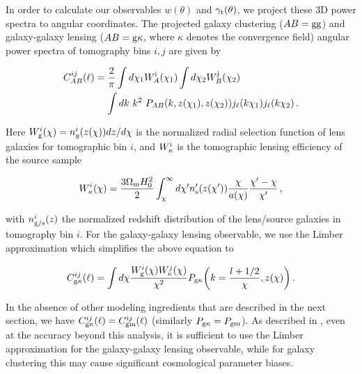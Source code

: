 \documentclass[aps, prd,twocolumn,superscriptaddress,nofootinbib,preprintnumbers]{revtex4-1}
\newcommand{\gammat}{\ensuremath{\gamma_{\rm t}(\theta)}}
\newcommand{\wtheta}{\ensuremath{w(\theta)}}
\begin{document}
In order to calculate our observables $\wtheta$ and $\gammat$, we project these 3D power spectra to angular coordinates. %
The projected galaxy clustering ($AB = \rm{gg}$) and galaxy-galaxy lensing ($AB={\rm g\kappa}$, where $\kappa$ denotes the convergence field) angular power spectra of tomography bins $i,j$ are given by
\begin{linenomath*}
\begin{align}\label{eq:Cl_exact}
    C^{ij}_{AB}(\ell) &= \frac{2}{\pi} \int d\chi_1 W^{\rm i}_{A}(\chi_1) \int d\chi_2 W^{\rm j}_{B}(\chi_2) \nonumber \\
    &\mathrel{\phantom{=}} \int dk \ k^2 \ P_{ AB}(k,z(\chi_1),z(\chi_2)) j_{\ell}(k \chi_1) j_{\ell}(k \chi_2)\,.
\end{align}
\end{linenomath*}
Here $W^{i}_{\rm g}(\chi) = n^{i}_g (z(\chi))dz/d\chi$ is the normalized radial selection function of lens galaxies for tomographic bin $i$, and $W^{\rm i}_{\kappa}$ is the tomographic lensing efficiency of the source sample
\begin{linenomath*}
\begin{equation}
    W^{i}_{\rm \kappa} (\chi)= \frac{3\Omega_{\rm m} H_0^2}{2} \int_{\chi}^{\infty} d\chi' n'_{\rm s} (z(\chi'))\frac{\chi}{a(\chi)}\frac{\chi' - \chi}{\chi'}\,,
\end{equation}
\end{linenomath*}
with $n_{\rm{g/s}}^i(z)$ the normalized redshift distribution of the lens/source galaxies in tomography bin $i$. 
For the galaxy-galaxy lensing observable, we use the Limber approximation \citep{Limber:53, LoVerde:2008re} which simplifies the above equation to
\begin{linenomath*}
\begin{equation}\label{eq:Cl_limber}
    C^{ij}_{\rm g\kappa}(\ell)  = \int d\chi \frac{W^{i}_{\rm g}(\chi) W^{j}_{\rm \kappa}(\chi)}{\chi^2} P_{\rm g\kappa}\bigg(k=\frac{l + 1/2}{\chi},z(\chi)\bigg)\,.
\end{equation}
\end{linenomath*}
In the absence of other modeling ingredients that are described in the next section, we have $C^{ij}_{\rm g\kappa}(\ell) = C^{ij}_{\rm gm}(\ell)$ (similarly $P_{\rm g\kappa} = P_{\rm gm}$). As described in \citet{Fang_nonlimber}, even at the accuracy beyond this analysis, it is sufficient to use  the Limber approximation for the galaxy-galaxy lensing observable, while for galaxy clustering this may cause significant cosmological parameter biases. 
\end{document}
